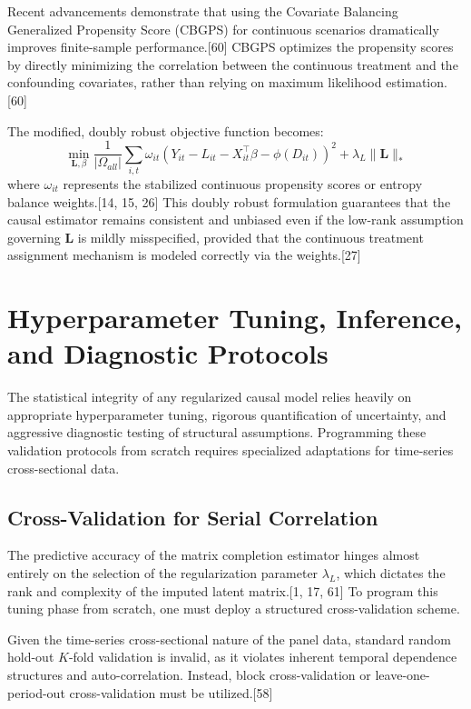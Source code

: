 \documentclass{article}
\begin{document}
Recent advancements demonstrate that using the Covariate Balancing Generalized Propensity Score (CBGPS) for continuous scenarios dramatically improves finite-sample performance.[60] CBGPS optimizes the propensity scores by directly minimizing the correlation between the continuous treatment and the confounding covariates, rather than relying on maximum likelihood estimation.[60]

The modified, doubly robust objective function becomes:
$$\min_{\mathbf{L}, \beta} \frac{1}{|\Omega_{all}|} \sum_{i,t} \omega_{it} \left( Y_{it} - L_{it} - X_{it}^\top \beta - \phi(D_{it}) \right)^2 + \lambda_L \|\mathbf{L}\|_*$$
where $\omega_{it}$ represents the stabilized continuous propensity scores or entropy balance weights.[14, 15, 26] This doubly robust formulation guarantees that the causal estimator remains consistent and unbiased even if the low-rank assumption governing $\mathbf{L}$ is mildly misspecified, provided that the continuous treatment assignment mechanism is modeled correctly via the weights.[27]

\section{Hyperparameter Tuning, Inference, and Diagnostic Protocols}

The statistical integrity of any regularized causal model relies heavily on appropriate hyperparameter tuning, rigorous quantification of uncertainty, and aggressive diagnostic testing of structural assumptions. Programming these validation protocols from scratch requires specialized adaptations for time-series cross-sectional data.

\subsection{Cross-Validation for Serial Correlation}

The predictive accuracy of the matrix completion estimator hinges almost entirely on the selection of the regularization parameter $\lambda_L$, which dictates the rank and complexity of the imputed latent matrix.[1, 17, 61] To program this tuning phase from scratch, one must deploy a structured cross-validation scheme.

Given the time-series cross-sectional nature of the panel data, standard random hold-out $K$-fold validation is invalid, as it violates inherent temporal dependence structures and auto-correlation. Instead, block cross-validation or leave-one-period-out cross-validation must be utilized.[58] 
\end{document}
